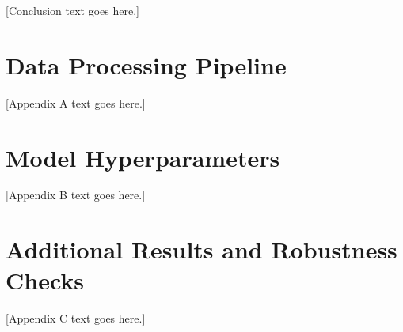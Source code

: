 \documentclass[12pt, a4paper]{article}
\begin{document}
[Conclusion text goes here.]

\newpage
\singlespacing
\printbibliography[title={References}]

\newpage
\appendix
\doublespacing

\section{Data Processing Pipeline}
\label{app:pipeline}

[Appendix A text goes here.]

\section{Model Hyperparameters}
\label{app:hyperparams}

[Appendix B text goes here.]

\section{Additional Results and Robustness Checks}
\label{app:robustness}

[Appendix C text goes here.]
\end{document}
